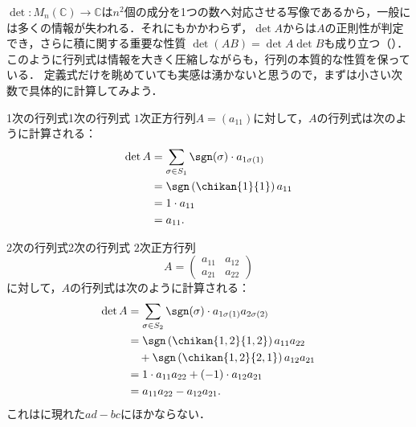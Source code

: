 $\det \colon M_n(\mathbb{C}) \to \mathbb{C}$は$n^2$個の成分を1つの数へ対応させる写像であるから，一般には多くの情報が失われる．それにもかかわらず，$\det A$からは$A$の正則性が判定でき，さらに積に関する重要な性質
$\det(AB)=\det A\det B$も成り立つ（）．このように行列式は情報を大きく圧縮しながらも，行列の本質的な性質を保っている．
定義式だけを眺めていても実感は湧かないと思うので，まずは小さい次数で具体的に計算してみよう．

\begin{example}{1次の行列式}{1次の行列式}
  $1$次正方行列$A = (a_{11})$に対して，$A$の行列式は次のように計算される：
  \begin{align*}
    \det A
    &= \sum_{\sigma \in S_1}
       \sgn(\sigma) \cdot a_{1\sigma(1)} \\
    &= \sgn\left( \chikan{1}{1} \right)
       a_{11} \\
    &= 1 \cdot a_{11} \\
    &= a_{11}.
  \end{align*}
\end{example}

\begin{example}{2次の行列式}{2次の行列式}
  $2$次正方行列
  \[
    A = \begin{pmatrix} a_{11} & a_{12} \\ a_{21} & a_{22} \end{pmatrix}
  \]
  に対して，$A$の行列式は次のように計算される：
  \begin{align*}
    \det A
    &= \sum_{\sigma \in S_2}
       \sgn(\sigma) \cdot a_{1\sigma(1)} a_{2\sigma(2)} \\
    &= \sgn\left( \chikan{1, 2}{1, 2} \right)
       a_{11} a_{22} \\
    &\quad + \sgn\left( \chikan{1, 2}{2, 1} \right)
       a_{12} a_{21} \\
    &= 1 \cdot a_{11} a_{22}
       + (-1) \cdot a_{12} a_{21} \\
    &= a_{11} a_{22}
       - a_{12} a_{21}.
  \end{align*}
  これはに現れた$ad - bc$にほかならない．
\end{example}

